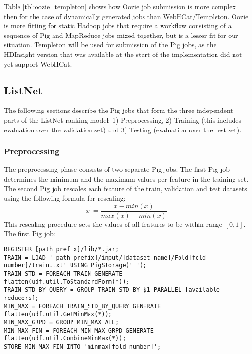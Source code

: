 Table \ref{tbl:oozie_templeton} shows how Oozie job submission is more complex then for the case of dynamically generated jobs than WebHCat/Templeton. Oozie is more fitting for static Hadoop jobs that require a workflow consisting of a sequence of Pig and MapReduce jobs mixed together, but is a lesser fit for our situation. Templeton will be used for submission of the Pig jobs, as the HDInsight version that was available at the start of the implementation did not yet support WebHCat.

\subsection{ListNet}
The following sections describe the Pig jobs that form the three independent parts of the ListNet ranking model: 1) Preprocessing, 2) Training (this includes evaluation over the validation set) and 3) Testing (evaluation over the test set). 
\subsubsection{Preprocessing}
The preprocessing phase consists of two separate Pig jobs. The first Pig job determines the minimum and the maximum values per feature in the training set. The second Pig job rescales each feature of the train, validation and test datasets using the following formula for rescaling:
\begin{equation}
x^{'} = \frac{x-min(x)}{max(x)-min(x)}
\end{equation}
This rescaling procedure sets the values of all features to be within range $[0,1]$.\\

The first Pig job:\\
\begin{minipage}{\linewidth}
\begin{lstlisting}
REGISTER [path prefix]/lib/*.jar;
TRAIN = LOAD '[path prefix]/input/[dataset name]/Fold[fold number]/train.txt' USING PigStorage(' ');
TRAIN_STD = FOREACH TRAIN GENERATE flatten(udf.util.ToStandardForm(*));
TRAIN_STD_BY_QUERY = GROUP TRAIN_STD BY $1 PARALLEL [available reducers];
MIN_MAX = FOREACH TRAIN_STD_BY_QUERY GENERATE flatten(udf.util.GetMinMax(*));
MIN_MAX_GRPD = GROUP MIN_MAX ALL;
MIN_MAX_FIN = FOREACH MIN_MAX_GRPD GENERATE flatten(udf.util.CombineMinMax(*));
STORE MIN_MAX_FIN INTO 'minmax[fold number]';
\end{lstlisting}
\end{minipage}

